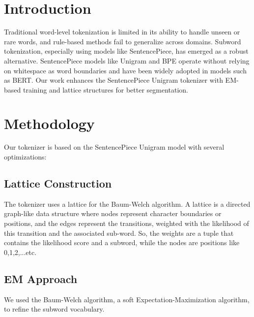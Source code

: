 \documentclass[twoside,11pt]{article}
\begin{document}
\section{Introduction}
Traditional word-level tokenization is limited in its ability to handle unseen or rare words, and rule-based methods fail to generalize across domains. Subword tokenization, especially using models like SentencePiece, has emerged as a robust alternative. SentencePiece models like Unigram and BPE operate without relying on whitespace as word boundaries and have been widely adopted in models such as BERT. Our work enhances the SentencePiece Unigram tokenizer with EM-based training and lattice structures for better segmentation.

\section{Methodology}
Our tokenizer is based on the SentencePiece Unigram model with several optimizations:

\subsection{Lattice Construction}
The tokenizer uses a lattice for the Baum-Welch algorithm. A lattice is a directed graph-like data structure where nodes represent character boundaries or positions, and the edges represent the transitions, weighted with the likelihood of this transition and the associated sub-word. So, the weights are a tuple that contains the likelihood score and a subword, while the nodes are positions like 0,1,2,...etc.

\subsection{EM Approach}
We used the Baum-Welch algorithm, a soft Expectation-Maximization algorithm, to refine the subword vocabulary. 
\end{document}
